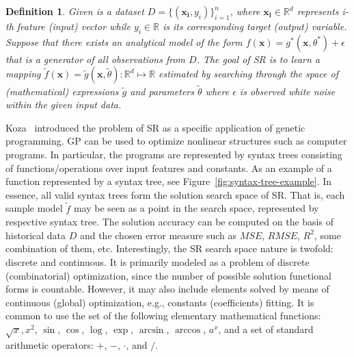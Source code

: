 \documentclass[a4paper,12pt]{elsarticle}
\newtheorem{definition}{Definition}
\begin{document}
	\begin{definition}
		Given is a dataset $D = \{(\mathbf{x_i}, y_i)\}_{i=1}^n$, where $\mathbf{x_i} \in \mathbb{R}^d$ represents i-th feature (input) vector while $y_i \in \mathbb{R}$ is its corresponding target (output) variable. Suppose that there exists an analytical model of the form $f(\mathbf{x})= g^*(\mathbf{x}, \theta^*) + \epsilon $ that is a generator of all observations from $D$.  
		The goal of SR is to learn a mapping $\tilde{f}(\mathbf{x})=  \tilde{g}(\mathbf{x}, \tilde{\theta})  \colon \mathbb{R}^d \mapsto \mathbb{R}$  estimated by searching through the space of (mathematical) expressions  $\tilde{g}$ and parameters $\tilde{\theta}$ where  $\epsilon$ is observed white noise within the given input data. 
		
	\end{definition}
	
	Koza~\cite{koza1994genetic} introduced the problem of SR as a specific application of genetic programming. GP can be used to optimize nonlinear structures such as computer programs. In particular, the programs are represented by syntax trees consisting of functions/operations over input features and constants. As an example of a function represented by a syntax tree, see Figure~\ref{fig:syntax-tree-example}. In essence, all valid syntax trees form the solution search space of SR. That is, each sample model $\tilde{f}$ may be seen as a point in the search space, represented by respective syntax tree. The solution accuracy can be computed on the basis of historical data $D$ and the chosen error measure such as $MSE$, $RMSE$, $R^2$, some combination of them, etc. Interestingly, the SR search space nature is twofold: discrete and continuous. It is primarily modeled as a problem of discrete (combinatorial) optimization, since the number of possible solution functional forms is countable. However, it may also include elements solved by means of continuous (global) optimization, e.g., constants (coefficients) fitting. It is common to use the set of the following elementary mathematical functions: $\sqrt{x}, x^2 $, $\sin$, $\cos$, $\log$, $\exp$, $\arcsin$, $\arccos$, $a^x$, and a set of standard arithmetic operators: $+$, $-$, $\cdot$, and $/$. 
	
\end{document}
